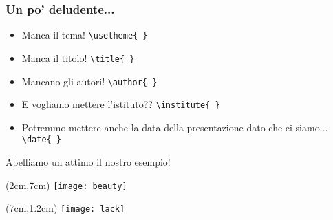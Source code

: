 \begin{frame}
 
 \frametitle{Un po' deludente...}
 
 \begin{itemize}
  \item<1-> Manca il tema! \texttt{\textbackslash usetheme\{ \}}
  \item<2-> Manca il titolo! \texttt{\textbackslash title\{ \}}
  \item<3-> Mancano gli autori! \texttt{\textbackslash author\{ \}}
  \item<4-> E vogliamo mettere l'istituto?? \texttt{\textbackslash institute\{ 
\}}
  \item<5-> Potremmo mettere anche la data della presentazione dato che ci 
siamo... 
\texttt{\textbackslash date\{ \}}
 \end{itemize}
 
 Abelliamo un attimo il nostro esempio!
 
 \begin{textblock*}{5cm}(2cm,7cm)
    \texttt{[image: beauty]}
 \end{textblock*}
 
 
 \begin{textblock*}{5cm}(7cm,1.2cm)
    \texttt{[image: lack]}
 \end{textblock*}

\end{frame}
 

